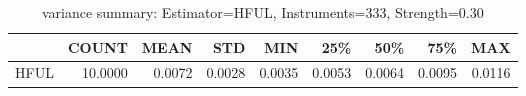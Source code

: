 \begin{table}[ht]
\centering
\caption{variance summary: Estimator=HFUL, Instruments=333, Strength=0.30}
\begin{tabular}{lrrrrrrrr}
\toprule
 & COUNT & MEAN & STD & MIN & 25\% & 50\% & 75\% & MAX \\
\midrule
HFUL & 10.0000 & 0.0072 & 0.0028 & 0.0035 & 0.0053 & 0.0064 & 0.0095 & 0.0116 \\
\bottomrule
\end{tabular}
\end{table}

